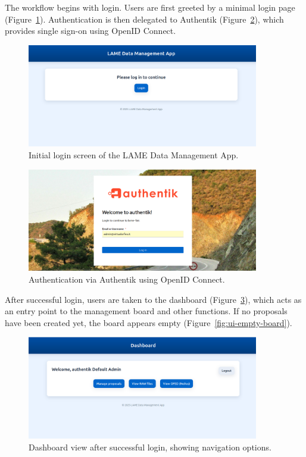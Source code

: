 The workflow begins with login. Users are first greeted by a minimal login page 
(Figure~\ref{fig:ui-login}). Authentication is then delegated to Authentik 
(Figure~\ref{fig:ui-authentik}), which provides single sign-on using OpenID Connect.

\begin{figure}[!h]
	\centering
	\includegraphics[width=0.9\textwidth]{img/chpt5/ui_login.png}
	\caption{Initial login screen of the LAME Data Management App.}
	\label{fig:ui-login}
\end{figure}

\begin{figure}[!h]
	\centering
	\includegraphics[width=0.9\textwidth]{img/chpt5/ui_authentik.png}
	\caption{Authentication via Authentik using OpenID Connect.}
	\label{fig:ui-authentik}
\end{figure}

\FloatBarrier
After successful login, users are taken to the dashboard (Figure~\ref{fig:ui-dashboard}), 
which acts as an entry point to the management board and other functions. 
If no proposals have been created yet, the board appears empty 
(Figure~\ref{fig:ui-empty-board}).

\begin{figure}[!h]
	\centering
	\includegraphics[width=0.9\textwidth]{img/chpt5/ui_dashboard.png}
	\caption{Dashboard view after successful login, showing navigation options.}
	\label{fig:ui-dashboard}
\end{figure}

